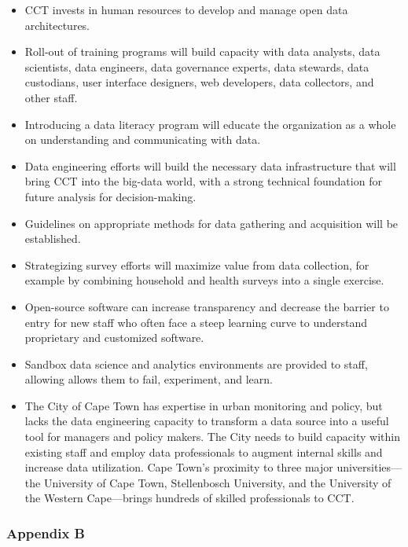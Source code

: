\documentclass[
]{WileySix}
\providecommand{\tightlist}{%
  \setlength{\itemsep}{0pt}\setlength{\parskip}{0pt}}
\begin{document}
\begin{itemize}
\tightlist
\item
  CCT invests in human resources to develop and manage open data architectures.
\item
  Roll-out of training programs will build capacity with data analysts, data scientists, data engineers, data governance experts, data stewards, data custodians, user interface designers, web developers, data collectors, and other staff.
\item
  Introducing a data literacy program will educate the organization as a whole on understanding and communicating with data.
\item
  Data engineering efforts will build the necessary data infrastructure that will bring CCT into the big-data world, with a strong technical foundation for future analysis for decision-making.
\item
  Guidelines on appropriate methods for data gathering and acquisition will be established.
\item
  Strategizing survey efforts will maximize value from data collection, for example by combining household and health surveys into a single exercise.
\item
  Open-source software can increase transparency and decrease the barrier to entry for new staff who often face a steep learning curve to understand proprietary and customized software.
\item
  Sandbox data science and analytics environments are provided to staff, allowing allows them to fail, experiment, and learn.
\item
  The City of Cape Town has expertise in urban monitoring and policy, but lacks the data engineering capacity to transform a data source into a useful tool for managers and policy makers. The City needs to build capacity within existing staff and employ data professionals to augment internal skills and increase data utilization. Cape Town's proximity to three major universities---the University of Cape Town, Stellenbosch University, and the University of the Western Cape---brings hundreds of skilled professionals to CCT.
\end{itemize}

\hypertarget{appendix-b-3}{%
\subsubsection*{Appendix B}\label{appendix-b-3}}
\end{document}
